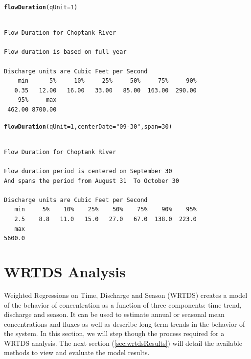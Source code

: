 \documentclass[a4paper,11pt]{article}\usepackage[]{graphicx}\usepackage[]{color}
\makeatletter
\newcommand{\hlnum}[1]{\textcolor[rgb]{0.686,0.059,0.569}{#1}}%
\newcommand{\hlstr}[1]{\textcolor[rgb]{0.192,0.494,0.8}{#1}}%
\newcommand{\hlstd}[1]{\textcolor[rgb]{0.345,0.345,0.345}{#1}}%
\newcommand{\hlkwc}[1]{\textcolor[rgb]{0.333,0.667,0.333}{#1}}%
\newcommand{\hlkwd}[1]{\textcolor[rgb]{0.737,0.353,0.396}{\textbf{#1}}}%
\newenvironment{kframe}{%
 \def\at@end@of@kframe{}%
 \ifinner\ifhmode%
  \def\at@end@of@kframe{\end{minipage}}%
  \begin{minipage}{\columnwidth}%
 \fi\fi%
 \def\FrameCommand##1{\hskip\@totalleftmargin \hskip-\fboxsep
 \colorbox{shadecolor}{##1}\hskip-\fboxsep
     \hskip-\linewidth \hskip-\@totalleftmargin \hskip\columnwidth}%
 \MakeFramed {\advance\hsize-\width
   \@totalleftmargin\z@ \linewidth\hsize
   \@setminipage}}%
 {\par\unskip\endMakeFramed%
 \at@end@of@kframe}
\newenvironment{knitrout}{}{} %
\makeatother
\begin{document}
\begin{knitrout}
\color{fgcolor}\begin{kframe}
\begin{alltt}
\hlkwd{flowDuration}\hlstd{(}\hlkwc{qUnit}\hlstd{=}\hlnum{1}\hlstd{)}
\end{alltt}
\begin{verbatim}

Flow Duration for Choptank River 

Flow duration is based on full year

Discharge units are Cubic Feet per Second 
    min      5%     10%     25%     50%     75%     90% 
   0.35   12.00   16.00   33.00   85.00  163.00  290.00 
    95%     max 
 462.00 8700.00 
\end{verbatim}
\begin{alltt}
\hlkwd{flowDuration}\hlstd{(}\hlkwc{qUnit}\hlstd{=}\hlnum{1}\hlstd{,} \hlkwc{centerDate}\hlstd{=}\hlstr{"09-30"}\hlstd{,} \hlkwc{span}\hlstd{=}\hlnum{30}\hlstd{)}
\end{alltt}
\begin{verbatim}

Flow Duration for Choptank River 

Flow duration period is centered on September 30 
And spans the period from August 31  To October 30

Discharge units are Cubic Feet per Second 
   min     5%    10%    25%    50%    75%    90%    95% 
   2.5    8.8   11.0   15.0   27.0   67.0  138.0  223.0 
   max 
5600.0 
\end{verbatim}
\end{kframe}
\end{knitrout}

\FloatBarrier
\section{WRTDS Analysis}
\label{sec:wrtds}
Weighted Regressions on Time, Discharge and Season (WRTDS) creates a model of the behavior of concentration as a function of three components: time trend, discharge and season.  It can be used to estimate annual or seasonal mean concentrations and fluxes as well as describe long-term trends in the behavior of the system. In this section, we will step though the process required for a WRTDS analysis. The next section (\ref{sec:wrtdsResults}) will detail the available methods to view and evaluate the model results. 
\end{document}
